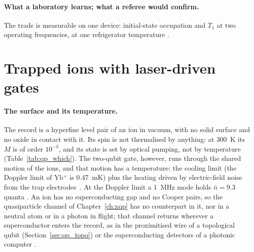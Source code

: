 \paragraph{What a laboratory learns; what a referee would confirm.} The trade is measurable on one device: initial-state occupation and
$T_1$ at two operating frequencies, at one refrigerator temperature \interp.

\section{Trapped ions with laser-driven gates}\label{sec:qp_ionlaser}
\paragraph{The surface and its temperature.} The record is a hyperfine level pair of an ion in vacuum, with no solid surface and no oxide
in contact with it. Its spin is not thermalised by anything: at 300~K its $M$ is of order $10^{-3}$, and its state is set by optical pumping, not by
temperature (Table~\ref{tab:qp_which}). The two-qubit gate, however, runs through the shared motion of the ions, and that motion has a
temperature: the cooling limit (the Doppler limit of Yb$^+$ is 0.47~mK) plus the heating driven by electric-field noise from the trap
electrodes~\cite{Brownnutt2015}. At the Doppler limit a 1~MHz mode holds $\bar n=9.3$ quanta \calc. An ion has no superconducting gap and no Cooper pairs, so the quasiparticle channel of Chapter~\ref{ch:xqp} has no counterpart in it,
nor in a neutral atom or in a photon in flight; that channel returns wherever a superconductor enters the record, as in the proximitised
wire of a topological qubit (Section~\ref{sec:qp_topo}) or the superconducting detectors of a photonic computer \interp.

